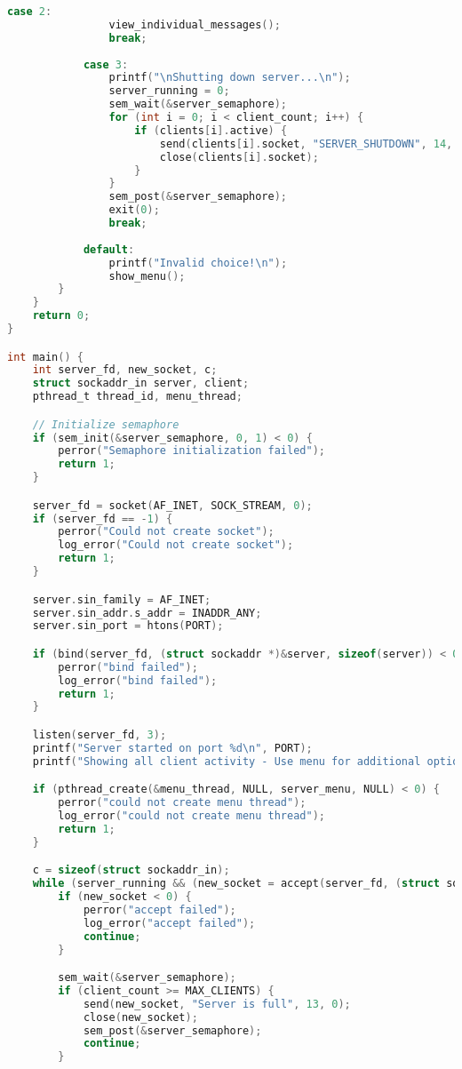\documentclass{article}
\begin{document}
\begin{lstlisting}[language=C, caption= server code - Socket Programming Code]
            case 2:
                view_individual_messages();
                break;
                
            case 3:
                printf("\nShutting down server...\n");
                server_running = 0;
                sem_wait(&server_semaphore);
                for (int i = 0; i < client_count; i++) {
                    if (clients[i].active) {
                        send(clients[i].socket, "SERVER_SHUTDOWN", 14, 0);
                        close(clients[i].socket);
                    }
                }
                sem_post(&server_semaphore);
                exit(0);
                break;
                
            default:
                printf("Invalid choice!\n");
                show_menu();
        }
    }
    return 0;
}

int main() {
    int server_fd, new_socket, c;
    struct sockaddr_in server, client;
    pthread_t thread_id, menu_thread;

    // Initialize semaphore
    if (sem_init(&server_semaphore, 0, 1) < 0) {
        perror("Semaphore initialization failed");
        return 1;
    }

    server_fd = socket(AF_INET, SOCK_STREAM, 0);
    if (server_fd == -1) {
        perror("Could not create socket");
        log_error("Could not create socket");
        return 1;
    }

    server.sin_family = AF_INET;
    server.sin_addr.s_addr = INADDR_ANY;
    server.sin_port = htons(PORT);

    if (bind(server_fd, (struct sockaddr *)&server, sizeof(server)) < 0) {
        perror("bind failed");
        log_error("bind failed");
        return 1;
    }

    listen(server_fd, 3);
    printf("Server started on port %d\n", PORT);
    printf("Showing all client activity - Use menu for additional options\n");

    if (pthread_create(&menu_thread, NULL, server_menu, NULL) < 0) {
        perror("could not create menu thread");
        log_error("could not create menu thread");
        return 1;
    }

    c = sizeof(struct sockaddr_in);
    while (server_running && (new_socket = accept(server_fd, (struct sockaddr *)&client, (socklen_t*)&c))) {
        if (new_socket < 0) {
            perror("accept failed");
            log_error("accept failed");
            continue;
        }

        sem_wait(&server_semaphore);
        if (client_count >= MAX_CLIENTS) {
            send(new_socket, "Server is full", 13, 0);
            close(new_socket);
            sem_post(&server_semaphore);
            continue;
        }


\end{lstlisting}
\end{document}
